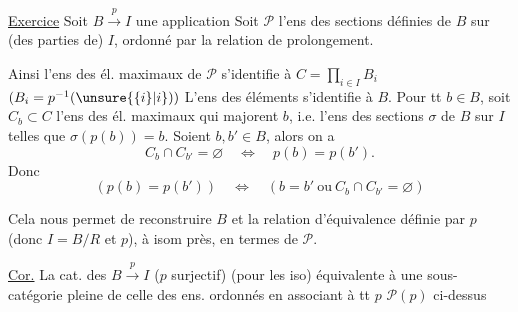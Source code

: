 \uline{Exercice} Soit $B\xrightarrow{p}I$ une application   Soit $\mathcal P$ l'ens des sections
 définies de $B$ sur (des parties de) $I$,
 ordonné par la relation de prolongement.

  Ainsi l'ens des él. maximaux
de $\mathcal P$ s'identifie à $C=\prod_{i\in I}B_i$ $(B_i=p^{-1}(\unsure{\{i\}|i}))$
L'ens des éléments   s'identifie à
$B$. Pour tt $b\in B$, soit  $C_b\subset C$ l'ens
des él. maximaux  qui majorent $b$,
i.e. l'ens des sections $\sigma$ de $B$ sur $I$ telles
que $\sigma(p(b))=b$. Soient $b,b'\in B$,  alors
on a
\[
 C_b\cap C_{b'}=\varnothing\quad\Longleftrightarrow\quad p(b)=p(b').
\]
Donc 
\[
 (p(b)=p(b'))\quad\Longleftrightarrow\quad(b=b'\ \text{ou}\ C_b\cap C_{b'}=\varnothing)
\]

Cela nous permet de reconstruire $B$ et
la relation d'équivalence  définie par $p$ 
 (donc $I=B/R$ et $p$), à isom près, en
termes de $\mathcal P$.

\uline{Cor.} La cat. des $B\xrightarrow{p}I$ ($p$ surjectif)
(pour les iso) équivalente à une sous-catégorie
pleine de celle des ens. ordonnés
en associant à tt $p$  $\mathcal P(p)$ ci-dessus
